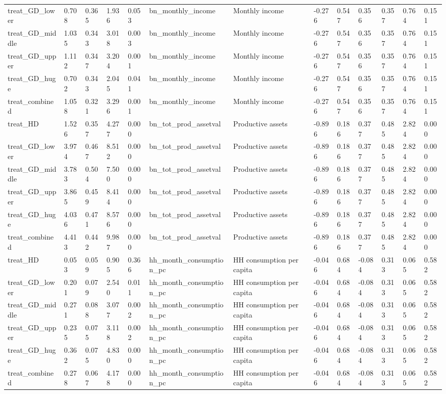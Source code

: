 \begin{tabular}{lllllllllllll}
treat\_GD\_lower & 0.708 & 0.365 & 1.936 & 0.053 & bn\_monthly\_income & Monthly income & -0.276 & 0.547 & 0.356 & 0.357 & 0.764 & 0.151 \\
treat\_GD\_middle & 1.035 & 0.343 & 3.018 & 0.003 & bn\_monthly\_income & Monthly income & -0.276 & 0.547 & 0.356 & 0.357 & 0.764 & 0.151 \\
treat\_GD\_upper & 1.112 & 0.347 & 3.204 & 0.001 & bn\_monthly\_income & Monthly income & -0.276 & 0.547 & 0.356 & 0.357 & 0.764 & 0.151 \\
treat\_GD\_huge & 0.702 & 0.343 & 2.045 & 0.041 & bn\_monthly\_income & Monthly income & -0.276 & 0.547 & 0.356 & 0.357 & 0.764 & 0.151 \\
treat\_combined & 1.058 & 0.321 & 3.296 & 0.001 & bn\_monthly\_income & Monthly income & -0.276 & 0.547 & 0.356 & 0.357 & 0.764 & 0.151 \\
treat\_HD & 1.526 & 0.357 & 4.277 & 0.000 & bn\_tot\_prod\_assetval & Productive assets & -0.896 & 0.186 & 0.377 & 0.485 & 2.824 & 0.000 \\
treat\_GD\_lower & 3.974 & 0.467 & 8.512 & 0.000 & bn\_tot\_prod\_assetval & Productive assets & -0.896 & 0.186 & 0.377 & 0.485 & 2.824 & 0.000 \\
treat\_GD\_middle & 3.783 & 0.504 & 7.500 & 0.000 & bn\_tot\_prod\_assetval & Productive assets & -0.896 & 0.186 & 0.377 & 0.485 & 2.824 & 0.000 \\
treat\_GD\_upper & 3.865 & 0.459 & 8.414 & 0.000 & bn\_tot\_prod\_assetval & Productive assets & -0.896 & 0.186 & 0.377 & 0.485 & 2.824 & 0.000 \\
treat\_GD\_huge & 4.036 & 0.471 & 8.576 & 0.000 & bn\_tot\_prod\_assetval & Productive assets & -0.896 & 0.186 & 0.377 & 0.485 & 2.824 & 0.000 \\
treat\_combined & 4.413 & 0.442 & 9.987 & 0.000 & bn\_tot\_prod\_assetval & Productive assets & -0.896 & 0.186 & 0.377 & 0.485 & 2.824 & 0.000 \\
treat\_HD & 0.053 & 0.059 & 0.905 & 0.366 & hh\_month\_consumption\_pc & HH consumption per capita & -0.046 & 0.684 & -0.084 & 0.313 & 0.065 & 0.582 \\
treat\_GD\_lower & 0.201 & 0.079 & 2.540 & 0.011 & hh\_month\_consumption\_pc & HH consumption per capita & -0.046 & 0.684 & -0.084 & 0.313 & 0.065 & 0.582 \\
treat\_GD\_middle & 0.271 & 0.088 & 3.077 & 0.002 & hh\_month\_consumption\_pc & HH consumption per capita & -0.046 & 0.684 & -0.084 & 0.313 & 0.065 & 0.582 \\
treat\_GD\_upper & 0.235 & 0.075 & 3.118 & 0.002 & hh\_month\_consumption\_pc & HH consumption per capita & -0.046 & 0.684 & -0.084 & 0.313 & 0.065 & 0.582 \\
treat\_GD\_huge & 0.362 & 0.075 & 4.830 & 0.000 & hh\_month\_consumption\_pc & HH consumption per capita & -0.046 & 0.684 & -0.084 & 0.313 & 0.065 & 0.582 \\
treat\_combined & 0.278 & 0.067 & 4.178 & 0.000 & hh\_month\_consumption\_pc & HH consumption per capita & -0.046 & 0.684 & -0.084 & 0.313 & 0.065 & 0.582 \\
\bottomrule
\end{tabular}
